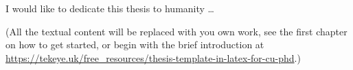 
\begin{dedication} 

I would like to dedicate this thesis to humanity \dots

(All the textual content will be replaced with you own work, see the first chapter on how to get started, or begin with the brief introduction at \url{https://tekeye.uk/free_resources/thesis-template-in-latex-for-cu-phd}.)

\end{dedication}

